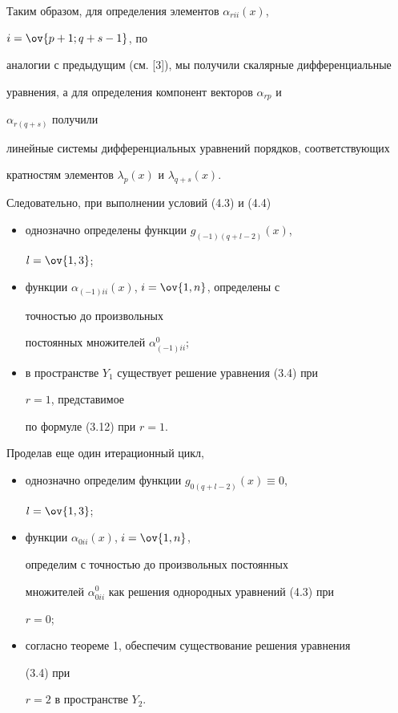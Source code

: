  


Таким образом, для определения элементов $\alpha_{rii}(x)$, 


$i=\ov{p+1;q+s-1}$, по 


аналогии с предыдущим (см. [3]), мы получили скалярные дифференциальные 


уравнения, а для определения компонент векторов $\alpha_{rp}$ и 


$\alpha_{r(q+s)}$ получили 


линейные системы дифференциальных уравнений порядков, соответствующих 


кратностям элементов $\lambda_p(x)$ и $\lambda_{q+s}(x)$. 


 


Следовательно, при выполнении условий (4.3) и (4.4) 


\begin{itemize} 


\item[1)] однозначно определены функции $g_{(-1)(q+l-2)}(x)$, 


$l=\ov{1,3}$; 


\item[2)] функции $\alpha_{(-1)ii}(x)$, $i=\ov{1,n}$, определены с 


точностью до произвольных 


постоянных множителей $\alpha^0_{(-1)ii}$; 


\item[3)] в пространстве $Y_1$ существует решение уравнения (3.4) при 


$r=1$, представимое 


по формуле (3.12) при $r=1$. 


\end{itemize} 


 


Проделав еще один итерационный цикл, 


\begin{itemize} 


\item[1)] однозначно определим функции $g_{0(q+l-2)}(x)\equiv 0$, 


$l=\ov{1,3}$; 


\item[2)] функции $\alpha_{0ii}(x)$, $i=\ov{1,n}$, 


определим с точностью до произвольных постоянных 


множителей $\alpha^0_{0ii}$ как решения однородных уравнений (4.3) при 


$r=0$; 


\item[3)] согласно теореме 1, обеспечим существование решения уравнения 


(3.4) при 


$r=2$ в пространстве $Y_2$. 


\end{itemize} 


